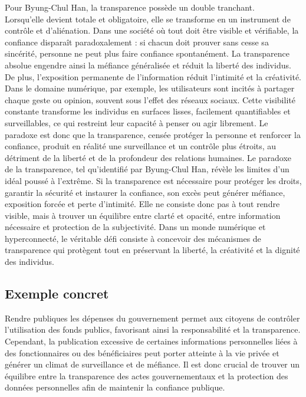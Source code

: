 \documentclass[12pt,a4paper]{report}
\begin{document}
	Pour Byung-Chul Han, la transparence possède un double tranchant.\\ Lorsqu’elle devient totale et obligatoire, elle se transforme en un instrument de contrôle et d’aliénation. Dans une société où tout doit être visible et vérifiable, la confiance disparaît paradoxalement : si chacun doit prouver sans cesse sa sincérité, personne ne peut plus faire confiance spontanément. La transparence absolue engendre ainsi la méfiance généralisée et réduit la liberté des individus.
	De plus, l’exposition permanente de l’information réduit l’intimité et la créativité. Dans le domaine numérique, par exemple, les utilisateurs sont incités à partager chaque geste ou opinion, souvent sous l’effet des réseaux sociaux. Cette visibilité constante transforme les individus en surfaces lisses, facilement quantifiables et surveillables, ce qui restreint leur capacité à penser ou agir librement. Le paradoxe est donc que la transparence, censée protéger la personne et renforcer la confiance, produit en réalité une surveillance et un contrôle plus étroits, au détriment de la liberté et de la profondeur des relations humaines.
	Le paradoxe de la transparence, tel qu’identifié par Byung-Chul Han, révèle les limites d’un idéal poussé à l’extrême. Si la transparence est nécessaire pour protéger les droits, garantir la sécurité et instaurer la confiance, son excès peut générer méfiance, exposition forcée et perte d’intimité. Elle ne consiste donc pas à tout rendre visible, mais à trouver un équilibre entre clarté et opacité, entre information nécessaire et protection de la subjectivité. Dans un monde numérique et hyperconnecté, le véritable défi consiste à concevoir des mécanismes de transparence qui protègent tout en préservant la liberté, la créativité et la dignité des individus.
	
	\subsection*{ Exemple concret}
	Rendre publiques les dépenses du gouvernement permet aux citoyens de contrôler l'utilisation des fonds publics, favorisant ainsi la responsabilité et la transparence. Cependant, la publication excessive de certaines informations personnelles liées à des fonctionnaires ou des bénéficiaires peut porter atteinte à la vie privée et générer un climat de surveillance et de méfiance. Il est donc crucial de trouver un équilibre entre la transparence des actes gouvernementaux et la protection des données personnelles afin de maintenir la confiance publique.
	
\end{document}
